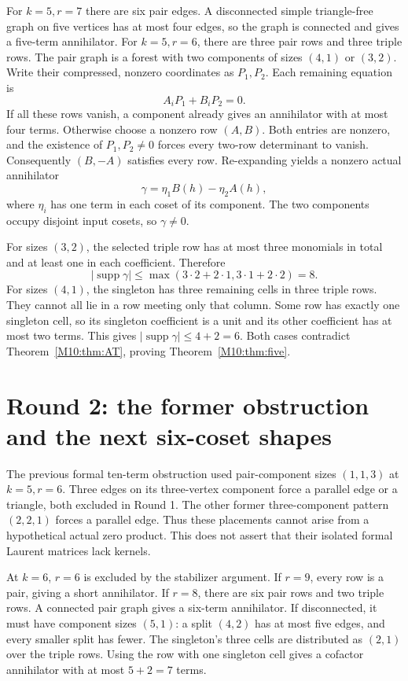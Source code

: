 \documentclass[11pt,a4paper,oneside]{report}
\theoremstyle{definition}
\theoremstyle{remark}
\DeclareMathOperator{\supp}{supp}
\begin{document}
For $k=5,r=7$ there are six pair edges. A disconnected simple
triangle-free graph on five vertices has at most four edges, so
the graph is connected and gives a five-term annihilator.
For $k=5,r=6$, there are three pair rows and three triple rows.
The pair graph is a forest with two components of sizes $(4,1)$
or $(3,2)$. Write their compressed, nonzero coordinates as
$P_1,P_2$. Each remaining equation is
\[
A_iP_1+B_iP_2=0.
\]
If all these rows vanish, a component already gives an annihilator
with at most four terms. Otherwise choose a nonzero row $(A,B)$.
Both entries are nonzero, and the existence of $P_1,P_2\ne0$
forces every two-row determinant to vanish. Consequently $(B,-A)$
satisfies every row. Re-expanding yields a nonzero actual annihilator
\[
\gamma=\eta_1B(h)-\eta_2A(h),
\]
where $\eta_i$ has one term in each coset of its component.
The two components occupy disjoint input cosets, so $\gamma\ne0$.

For sizes $(3,2)$, the selected triple row has at most three
monomials in total and at least one in each coefficient. Therefore
\[
|\supp\gamma|\le\max(3\cdot2+2\cdot1,
3\cdot1+2\cdot2)=8.
\]
For sizes $(4,1)$, the singleton has three remaining cells in
three triple rows. They cannot all lie in a row meeting only that
column. Some row has exactly one singleton cell, so its singleton
coefficient is a unit and its other coefficient has at most two
terms. This gives $|\supp\gamma|\le4+2=6$.
Both cases contradict Theorem~\ref{M10:thm:AT}, proving
Theorem~\ref{M10:thm:five}.

\section{Round 2: the former obstruction and the next six-coset shapes}
The previous formal ten-term obstruction used pair-component sizes
$(1,1,3)$ at $k=5,r=6$. Three edges on its three-vertex component
force a parallel edge or a triangle, both excluded in Round 1.
The other former three-component pattern $(2,2,1)$ forces a parallel
edge. Thus these placements cannot arise from a hypothetical actual
zero product. This does not assert that their isolated formal Laurent
matrices lack kernels.

At $k=6$, $r=6$ is excluded by the stabilizer argument.
If $r=9$, every row is a pair, giving a short annihilator.
If $r=8$, there are six pair rows and two triple rows. A connected
pair graph gives a six-term annihilator. If disconnected, it must
have component sizes $(5,1)$: a split $(4,2)$ has at most five
edges, and every smaller split has fewer. The singleton's three
cells are distributed as $(2,1)$ over the triple rows. Using the
row with one singleton cell gives a cofactor annihilator with at
most $5+2=7$ terms.
\end{document}
